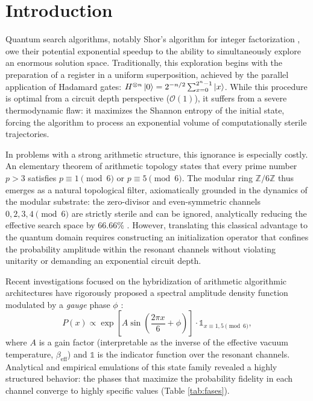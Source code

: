 \documentclass[reprint,aps,pra,superscriptaddress,nofootinbib]{revtex4-2}
\theoremstyle{plain}
\theoremstyle{definition}
\theoremstyle{remark}
\begin{document}
\section{Introduction}

Quantum search algorithms, notably Shor's algorithm for integer factorization \cite{Shor1994}, owe their potential exponential speedup to the ability to simultaneously explore an enormous solution space. Traditionally, this exploration begins with the preparation of a register in a uniform superposition, achieved by the parallel application of Hadamard gates: $H^{\otimes n}\ket{0} = 2^{-n/2}\sum_{x=0}^{2^n-1}\ket{x}$. While this procedure is optimal from a circuit depth perspective ($\mathcal{O}(1)$), it suffers from a severe thermodynamic flaw: it maximizes the Shannon entropy of the initial state, forcing the algorithm to process an exponential volume of computationally sterile trajectories.

In problems with a strong arithmetic structure, this ignorance is especially costly. An elementary theorem of arithmetic topology states that every prime number $p>3$ satisfies $p \equiv 1 \pmod 6$ or $p \equiv 5 \pmod 6$. The modular ring $\mathbb{Z}/6\mathbb{Z}$ thus emerges as a natural topological filter, axiomatically grounded in the dynamics of the modular substrate: the zero-divisor and even-symmetric channels $0,2,3,4 \pmod 6$ are strictly sterile and can be ignored, analytically reducing the effective search space by $66.66\%$ \cite{Peinador_Modular_Substrate_2025, Peinador_Emergencia_Geometria_2025}. However, translating this classical advantage to the quantum domain requires constructing an initialization operator that confines the probability amplitude within the resonant channels without violating unitarity or demanding an exponential circuit depth.

Recent investigations focused on the hybridization of arithmetic algorithmic architectures have rigorously proposed a spectral amplitude density function modulated by a \textit{gauge} phase $\phi$ \cite{Peinador_Isomorfismo_DSP_2025}:
\begin{equation}
P(x) \propto \exp\left[A \sin\left(\frac{2\pi x}{6} + \phi\right)\right] \cdot \mathds{1}_{x\equiv 1,5 \pmod{6}},
\label{eq:amplitud}
\end{equation}
where $A$ is a gain factor (interpretable as the inverse of the effective vacuum temperature, $\beta_{\text{eff}}$) and $\mathds{1}$ is the indicator function over the resonant channels. Analytical and empirical emulations of this state family revealed a highly structured behavior: the phases that maximize the probability fidelity in each channel converge to highly specific values (Table \ref{tab:fases}).
\end{document}
